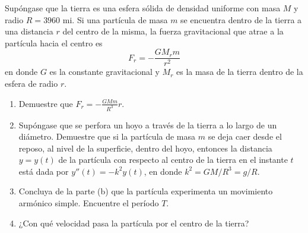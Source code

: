 \item Supóngase que la tierra es una esfera sólida de densidad uniforme con masa $M$ y radio $R = 3960 \text{ mi}$. Si una partícula de masa $m$ se encuentra dentro de la tierra a una distancia $r$ del centro de la misma, la fuerza gravitacional que atrae a la partícula hacia el centro es
    \[ F_r = -\frac{GM_r m}{r^2} \]
    en donde $G$ es la constante gravitacional y $M_r$ es la masa de la tierra dentro de la esfera de radio $r$.
    \begin{enumerate}
        \item[(a)] Demuestre que $F_r = -\frac{GMm}{R^3} r$.
        \item[(b)] Supóngase que se perfora un hoyo a través de la tierra a lo largo de un diámetro. Demuestre que si la partícula de masa $m$ se deja caer desde el reposo, al nivel de la superficie, dentro del hoyo, entonces la distancia $y = y(t)$ de la partícula con respecto al centro de la tierra en el instante $t$ está dada por $y''(t) = -k^2y(t)$, en donde $k^2 = GM/R^3 = g/R$.
        \item[(c)] Concluya de la parte (b) que la partícula experimenta un movimiento armónico simple. Encuentre el período $T$.
        \item[(d)] ¿Con qué velocidad pasa la partícula por el centro de la tierra?
    \end{enumerate}
